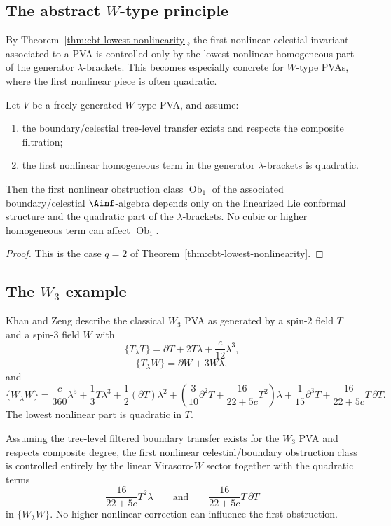 \subsection{The abstract $W$-type principle}

By Theorem~\ref{thm:cbt-lowest-nonlinearity}, the first nonlinear celestial invariant associated to a PVA is controlled only by the lowest nonlinear homogeneous part of the generator $\lambda$-brackets. This becomes especially concrete for $W$-type PVAs, where the first nonlinear piece is often quadratic.

\begin{corollary}
Let $V$ be a freely generated $W$-type PVA, and assume:
\begin{enumerate}[label=\textup{(\roman*)},leftmargin=2em]
\item the boundary/celestial tree-level transfer exists and respects the composite filtration;
\item the first nonlinear homogeneous term in the generator $\lambda$-brackets is quadratic.
\end{enumerate}
Then the first nonlinear obstruction class $\operatorname{Ob}_1$ of the associated boundary/celestial $\Ainf$-algebra depends only on the linearized Lie conformal structure and the quadratic part of the $\lambda$-brackets. No cubic or higher homogeneous term can affect $\operatorname{Ob}_1$.
\end{corollary}

\begin{proof}
This is the case $q=2$ of Theorem~\ref{thm:cbt-lowest-nonlinearity}.
\end{proof}

\subsection{The \texorpdfstring{$W_3$}{W3} example}

Khan and Zeng describe the classical $W_3$ PVA as generated by a spin-$2$ field $T$ and a spin-$3$ field $W$ with
\[
\{T_\lambda T\}=\partial T+2T\lambda+\frac{c}{12}\lambda^3,
\]
\[
\{T_\lambda W\}=\partial W+3W\lambda,
\]
and
\[
\{W_\lambda W\}
=
\frac{c}{360}\lambda^5
+\frac13 T\lambda^3
+\frac12(\partial T)\lambda^2
+\left(\frac{3}{10}\partial^2T+\frac{16}{22+5c}T^2\right)\lambda
+\frac1{15}\partial^3T
+\frac{16}{22+5c}T\,\partial T.
\]
The lowest nonlinear part is quadratic in $T$.

\begin{corollary}
Assuming the tree-level filtered boundary transfer exists for the $W_3$ PVA and respects composite degree, the first nonlinear celestial/boundary obstruction class is controlled entirely by the linear Virasoro-$W$ sector together with the quadratic terms
\[
\frac{16}{22+5c}T^2\lambda
\qquad\text{and}\qquad
\frac{16}{22+5c}T\,\partial T
\]
in $\{W_\lambda W\}$. No higher nonlinear correction can influence the first obstruction.
\end{corollary}

